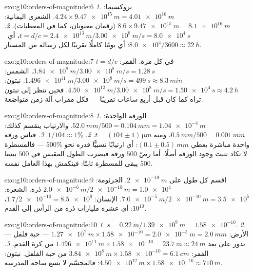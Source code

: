 \begin{solution}{exo:g10:orders-of-magnitude:6}
\emph{1.} بروكسيما:
$4.24 \times \qty{9.47e15}{m} = \qty{4.01e16}{m}$. الشعرى اليمانية:
$8.6 \times \qty{9.47e15}{m} = \qty{8.1e16}{m}$ (رقمان معنويان،
كما في المعطيات).
\emph{2.} $t = d/c = \qty{2.4e13}{m} / \qty{3.00e8}{m/s}
= \qty{8.0e4}{s}$، أي\ $\num{8.0e4}/3600 \approx \qty{22}{h}$:
أي يومًا كاملًا تقريبًا لكل رسالة من المسبار.
\end{solution}

\begin{solution}{exo:g10:orders-of-magnitude:7}
$t = d/c$ في كل مرة. القمر:
$\qty{3.84e8}{m}/\qty{3.00e8}{m/s} = \qty{1.28}{s}$. الشمس:
$\qty{1.496e11}{m}/\qty{3.00e8}{m/s} = \qty{499}{s} \approx
\qty{8.3}{min}$. نبتون:
$\qty{4.50e12}{m}/\qty{3.00e8}{m/s} = \qty{1.50e4}{s} \approx
\qty{4.2}{h}$. فحين تنظر إلى نبتون تراه كما كان قبل
أربع ساعات تقريبًا --- فكل مقراب آلة زمن متواضعة.
\end{solution}

\begin{solution}{exo:g10:orders-of-magnitude:8}
\emph{1.} الورقة الواحدة: $\qty{52.0}{mm}/500 = \qty{0.104}{mm}
= \qty{1.04e-4}{m}$. والارتياب ينقسم كذلك:
$\qty{0.5}{mm}/500 = \qty{0.001}{mm}$، ومنه
$t = (104 \pm 1)\,\unit{\micro m}$.
\emph{2.} $1/104 \approx 1\%$.
\emph{3.} قياس ورقة واحدة مباشرة يعطي
$(0.1 \pm 0.5)\,\unit{mm}$: أي ارتيابًا نسبيًّا قدره نحو $500\%$
--- فالمسطرة لا تكاد تثبت وجود الورقة أصلًا. أما رصّ $500$
ورقة فيضرب الطول المقيس في $500$ بينما يبقى  للمسطرة ثابتًا: فينكمش 
بهذا العامل نفسه $500$.
\end{solution}

\begin{solution}{exo:g10:orders-of-magnitude:9}
اقسم كل طول على $\qty{2e-10}{m}$. الجرثومة:
$\qty{2.0e-6}{m}/\qty{2e-10}{m} = \num{1.0e4}$ ذرة. الشعرة:
$\qty{7.0e-5}{m}/\qty{2e-10}{m} = \num{3.5e5}$. الإنسان:
$1.7/\num{2e-10} = \num{8.5e9}$،  $10^{10}$: أي عشرة
مليارات ذرة من الرأس إلى القدم.
\end{solution}

\begin{solution}{exo:g10:orders-of-magnitude:10}
\emph{1.} $s = \qty{0.22}{m}/\qty{1.39e9}{m} = \num{1.58e-10}$.
\emph{2.} الأرض:
$\qty{1.27e7}{m} \times \num{1.58e-10} = \qty{2.0e-3}{m} =
\qty{2.0}{mm}$ --- حبة فلفل --- تدور على بعد
$\qty{1.496e11}{m} \times \num{1.58e-10} = \qty{23.7}{m} \approx
\qty{24}{m}$ من كرة القدم.
\emph{3.} القمر:
$\qty{3.84e8}{m} \times \num{1.58e-10} = \qty{6.1}{cm}$ من حبة
الفلفل. نبتون:
$\qty{4.50e12}{m} \times \num{1.58e-10} \approx \qty{710}{m}$: فالمجسّم
لا يسع ساحة المدرسة.
\end{solution}

